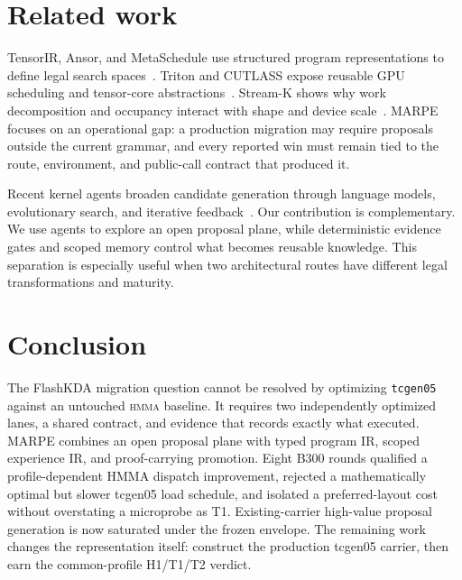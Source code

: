 \documentclass[11pt]{article}
\newcommand{\hmma}{\textsc{hmma}}
\newcommand{\tcgen}{\texttt{tcgen05}}
\begin{document}
\section{Related work}

TensorIR, Ansor, and MetaSchedule use structured program representations to define legal search spaces~\citep{tensorir2023,ansor2020,metaschedule2022}. Triton and CUTLASS expose reusable GPU scheduling and tensor-core abstractions~\citep{triton2019,cutlass2026}. Stream-K shows why work decomposition and occupancy interact with shape and device scale~\citep{streamk2023}. MARPE focuses on an operational gap: a production migration may require proposals outside the current grammar, and every reported win must remain tied to the route, environment, and public-call contract that produced it.

Recent kernel agents broaden candidate generation through language models, evolutionary search, and iterative feedback~\citep{asi2024,astra2025,kernelagent2026,kernelarc2026}. Our contribution is complementary. We use agents to explore an open proposal plane, while deterministic evidence gates and scoped memory control what becomes reusable knowledge. This separation is especially useful when two architectural routes have different legal transformations and maturity.

\section{Conclusion}

The FlashKDA migration question cannot be resolved by optimizing \tcgen{} against an untouched \hmma{} baseline. It requires two independently optimized lanes, a shared contract, and evidence that records exactly what executed. MARPE combines an open proposal plane with typed program IR, scoped experience IR, and proof-carrying promotion. Eight B300 rounds qualified a profile-dependent HMMA dispatch improvement, rejected a mathematically optimal but slower tcgen05 load schedule, and isolated a preferred-layout cost without overstating a microprobe as T1. Existing-carrier high-value proposal generation is now saturated under the frozen envelope. The remaining work changes the representation itself: construct the production tcgen05 carrier, then earn the common-profile H1/T1/T2 verdict.

{\small


}
\end{document}
